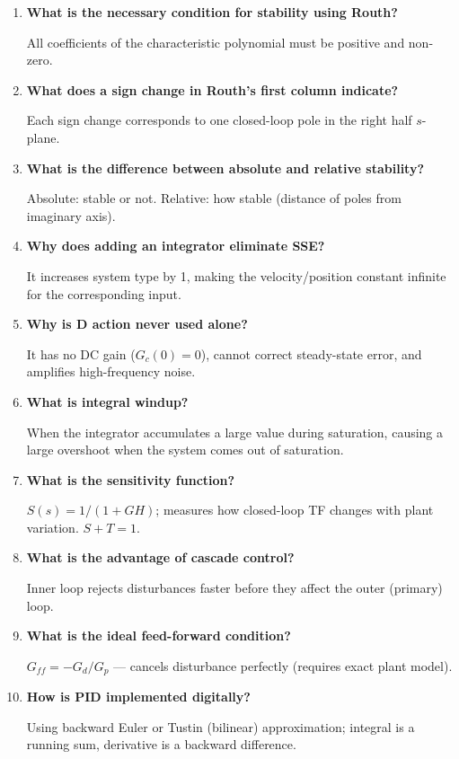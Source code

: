 \documentclass[12pt,a4paper]{article}
\newcommand{\Q}[1]{\textbf{#1}\par\noindent\ignorespaces}
\begin{document}
\begin{tcolorbox}[exambox, title={\textbf{Frequently Asked / Viva Questions}}]
\begin{enumerate}[leftmargin=*, topsep=0pt, label=\textbf{Q\arabic*.}, itemsep=8pt]
  \item \Q{What is the necessary condition for stability using Routh?} All coefficients of the characteristic polynomial must be positive and non-zero.
  \item \Q{What does a sign change in Routh's first column indicate?} Each sign change corresponds to one closed-loop pole in the right half $s$-plane.
  \item \Q{What is the difference between absolute and relative stability?} Absolute: stable or not. Relative: how stable (distance of poles from imaginary axis).
  \item \Q{Why does adding an integrator eliminate SSE?} It increases system type by 1, making the velocity/position constant infinite for the corresponding input.
  \item \Q{Why is D action never used alone?} It has no DC gain ($G_c(0)=0$), cannot correct steady-state error, and amplifies high-frequency noise.
  \item \Q{What is integral windup?} When the integrator accumulates a large value during saturation, causing a large overshoot when the system comes out of saturation.
  \item \Q{What is the sensitivity function?} $S(s) = 1/(1+GH)$; measures how closed-loop TF changes with plant variation. $S+T=1$.
  \item \Q{What is the advantage of cascade control?} Inner loop rejects disturbances faster before they affect the outer (primary) loop.
  \item \Q{What is the ideal feed-forward condition?} $G_{ff} = -G_d/G_p$ — cancels disturbance perfectly (requires exact plant model).
  \item \Q{How is PID implemented digitally?} Using backward Euler or Tustin (bilinear) approximation; integral is a running sum, derivative is a backward difference.
\end{enumerate}
\end{tcolorbox}

\vspace{5pt}
\end{document}
